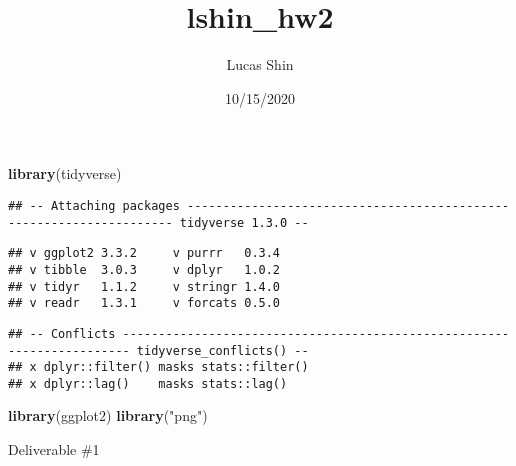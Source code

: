 \documentclass[
]{article}
\title{lshin\_hw2}
\author{Lucas Shin}
\date{10/15/2020}
\newenvironment{Shaded}{\begin{snugshade}}{\end{snugshade}}
\newcommand{\KeywordTok}[1]{\textcolor[rgb]{0.13,0.29,0.53}{\textbf{#1}}}
\newcommand{\NormalTok}[1]{#1}
\newcommand{\StringTok}[1]{\textcolor[rgb]{0.31,0.60,0.02}{#1}}
\begin{document}
\maketitle

\begin{Shaded}
\begin{Highlighting}[]
\KeywordTok{library}\NormalTok{(tidyverse)}
\end{Highlighting}
\end{Shaded}

\begin{verbatim}
## -- Attaching packages -------------------------------------------------------------------- tidyverse 1.3.0 --
\end{verbatim}

\begin{verbatim}
## v ggplot2 3.3.2     v purrr   0.3.4
## v tibble  3.0.3     v dplyr   1.0.2
## v tidyr   1.1.2     v stringr 1.4.0
## v readr   1.3.1     v forcats 0.5.0
\end{verbatim}

\begin{verbatim}
## -- Conflicts ----------------------------------------------------------------------- tidyverse_conflicts() --
## x dplyr::filter() masks stats::filter()
## x dplyr::lag()    masks stats::lag()
\end{verbatim}

\begin{Shaded}
\begin{Highlighting}[]
\KeywordTok{library}\NormalTok{(ggplot2)}
\KeywordTok{library}\NormalTok{(}\StringTok{"png"}\NormalTok{)}
\end{Highlighting}
\end{Shaded}

Deliverable \#1
\end{document}

